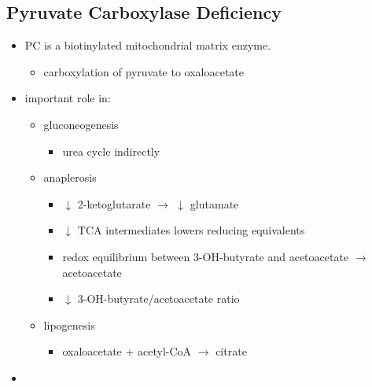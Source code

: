 \documentclass{scrartcl}
\begin{document}
\subsection{Pyruvate Carboxylase Deficiency}
\label{sec:orgedc30c4}
\begin{itemize}
\item PC is a biotinylated mitochondrial matrix enzyme.
\begin{itemize}
\item carboxylation of pyruvate to oxaloacetate
\end{itemize}


\item important role in:
\begin{itemize}
\item gluconeogenesis
\begin{itemize}
\item urea cycle indirectly
\end{itemize}
\item anaplerosis
\begin{itemize}
\item \(\downarrow\) 2-ketoglutarate \(\to\) \(\downarrow\) glutamate
\item \(\downarrow\) TCA intermediates lowers reducing equivalents
\item redox equilibrium between 3-OH-butyrate and acetoacetate \(\to\) acetoacetate
\item \(\downarrow\) 3-OH-butyrate/acetoacetate ratio
\end{itemize}
\item lipogenesis
\begin{itemize}
\item oxaloacetate + acetyl-CoA \(\to\) citrate
\end{itemize}
\end{itemize}
\item 
\end{itemize}
\end{document}
